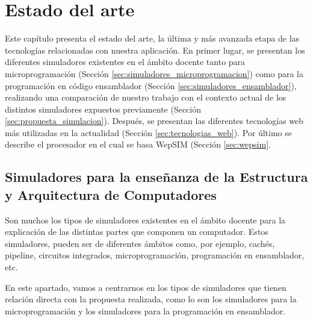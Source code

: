 \chead[]{}
\renewcommand{\headrulewidth}{0.5pt}

\lfoot[]{}
\cfoot[]{}
\rfoot[]{}
\renewcommand{\footrulewidth}{0pt}

\chapter{Estado del arte}
\label{ch:state_of_the_art}

Este capítulo presenta el estado del arte, la última y más avanzada etapa de las tecnologías relacionadas con nuestra aplicación. En primer lugar, se presentan los diferentes simuladores existentes en el ámbito docente tanto para microprogramación (Sección \ref{sec:simuladores_microprogramacion}) como para la programación en código ensamblador (Sección \ref{sec:simuladores_ensamblador}), realizando una comparación de nuestro trabajo con el contexto actual de los distintos simuladores expuestos previamente (Sección \ref{sec:propuesta_simulacion}). Después, se presentan las diferentes tecnologías web más utilizadas en la actualidad (Sección \ref{sec:tecnologias_web}). Por último se describe el procesador en el cual se basa WepSIM (Sección \ref{sec:wepsim}.

\section{Simuladores para la enseñanza de la Estructura y Arquitectura de Computadores}

Son muchos los tipos de simuladores existentes en el ámbito docente para la explicación de las distintas partes que componen un computador. Estos simuladores, pueden ser de diferentes ámbitos como, por ejemplo, cachés, pipeline, circuitos integrados, microprogramación, programación en ensamblador, etc.

En este apartado, vamos a centrarnos en los tipos de simuladores que tienen relación directa con la propuesta realizada, como lo son los simuladores para la microprogramación y los simuladores para la programación en ensamblador.

